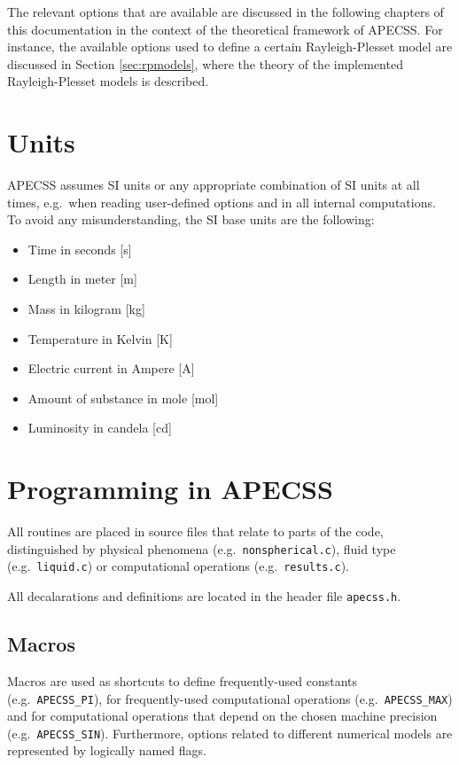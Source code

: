 The relevant options that are available are discussed in the following chapters of this documentation in the context of the theoretical framework of APECSS. For instance, the available options used to define a certain Rayleigh-Plesset model are discussed in Section \ref{sec:rpmodels}, where the theory of the implemented Rayleigh-Plesset models is described. 


\section{Units}

APECSS assumes SI units or any appropriate combination of SI units at all times, e.g.~when reading user-defined options and in all internal computations. To avoid any misunderstanding, the SI base units are the following:\vspace{-1em}
\begin{itemize}[noitemsep]
  \item Time in seconds [s]
  \item Length in meter [m]
  \item Mass in kilogram [kg]
  \item Temperature in Kelvin [K]
  \item Electric current in Ampere [A] 
  \item Amount of substance in mole [mol]
  \item Luminosity in candela [cd]
\end{itemize}


\section{Programming in APECSS}

All routines are placed in source files that relate to parts of the code, distinguished by physical phenomena (e.g.~{\tt nonspherical.c}), fluid type (e.g.~{\tt liquid.c}) or computational operations (e.g.~{\tt results.c}). 

All decalarations and definitions are located in the header file {\tt apecss.h}. 

\subsection{Macros}

Macros are used as shortcuts to define frequently-used constants (e.g.~{\tt APECSS\_PI}), for frequently-used computational operations (e.g.~{\tt APECSS\_MAX}) and for computational operations that depend on the chosen machine precision (e.g.~{\tt APECSS\_SIN}). Furthermore, options related to different numerical models are represented by logically named flags.

